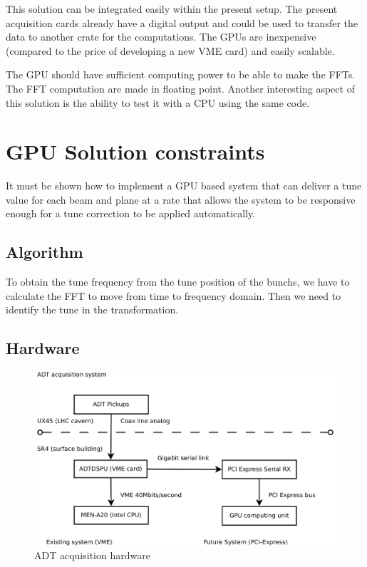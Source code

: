 This solution can be integrated easily within the present setup. The present acquisition cards already have a digital output and could be used to transfer the data to another crate for the computations. The \glspl{GPU} are inexpensive (compared to the price of developing a new \gls{VME} card) and easily scalable. 

The \gls{GPU} should have sufficient computing power to be able to make the \glspl{FFT}. The \gls{FFT} computation are made in floating point. Another interesting aspect of this solution is the ability to test it with a \gls{CPU} using the same code.

\section{GPU Solution constraints}

It must be shown how to implement a GPU based system that can deliver
a tune value for each beam and plane at a rate that allows the system
to be responsive enough for a tune correction to be applied
automatically.

\subsection{Algorithm}

To obtain the tune frequency from the tune position of the \glspl{bunch}, we have to calculate the FFT to move from time to frequency domain. Then we need to identify the tune in the transformation.

\subsection{Hardware}

\begin{figure}[H]
\caption{ADT acquisition hardware}
\centering
\includegraphics[scale=0.3]{acquisition.pdf}
\end{figure}

